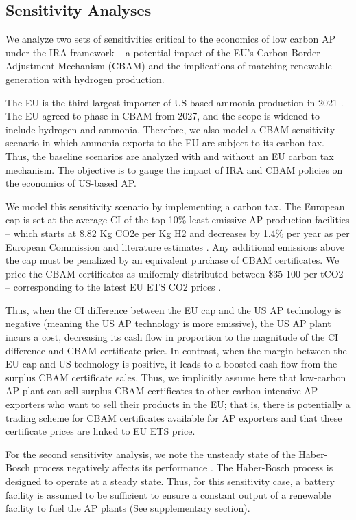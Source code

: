 \documentclass{article}
\begin{document}
\subsection*{Sensitivity Analyses}

We analyze two sets of sensitivities critical to the economics of low carbon AP under the IRA framework – a potential impact of the EU’s Carbon Border Adjustment Mechanism (CBAM) and the implications of matching renewable generation with hydrogen production.

The EU is the third largest importer of US-based ammonia production in 2021 \cite{IEA2021}. The EU agreed to phase in CBAM from 2027, and the scope is widened to include hydrogen and ammonia. Therefore, we also model a CBAM sensitivity scenario in which ammonia exports to the EU are subject to its carbon tax. Thus, the baseline scenarios are analyzed with and without an EU carbon tax mechanism. The objective is to gauge the impact of IRA and CBAM policies on the economics of US-based AP.

We model this sensitivity scenario by implementing a carbon tax. The European cap is set at the average CI of the top 10\% least emissive AP production facilities \cite{McDonald2023} – which starts at 8.82 Kg CO2e per  Kg H2 and decreases by 1.4\% per year as per European Commission and literature estimates \cite{McDonald2023, Kakoulaki2021, EU2020}. Any additional emissions above the cap must be penalized by an equivalent purchase of CBAM certificates. We price the CBAM certificates as uniformly distributed between \$35-100 per  tCO2 – corresponding to the latest EU ETS CO2 prices \cite{McDonald2023}. 

Thus, when the CI difference between the EU cap and the US AP technology is negative (meaning the US AP technology is more emissive), the US AP plant incurs a cost, decreasing its cash flow in proportion to the magnitude of the CI difference and CBAM certificate price. In contrast, when the margin between the EU cap and US technology is positive, it leads to a boosted cash flow from the surplus CBAM certificate sales. Thus, we implicitly assume here that low-carbon AP plant can sell surplus CBAM certificates to other carbon-intensive AP exporters who want to sell their products in the EU; that is, there is potentially a trading scheme for CBAM certificates available for AP exporters and that these certificate prices are linked to EU ETS price.

For the second sensitivity analysis, we note the unsteady state of the Haber-Bosch process negatively affects its performance \cite{Armijo2020}. The Haber-Bosch process is designed to operate at a steady state. Thus, for this sensitivity case, a battery facility is assumed to be sufficient to ensure a constant output of a renewable facility to fuel the AP plants (See supplementary section). 
	
\end{document}
